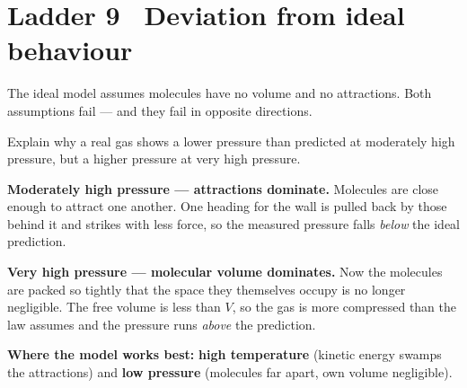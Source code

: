 \documentclass{apchem-worksheet}
\begin{document}
\section*{\sffamily Ladder 9 \textbullet\ Deviation from ideal behaviour}

The ideal model assumes molecules have no volume and no attractions. Both
assumptions fail --- and they fail in opposite directions.

\begin{workedexample}
Explain why a real gas shows a lower pressure than predicted at moderately
high pressure, but a higher pressure at very high pressure.

\textbf{Moderately high pressure --- attractions dominate.} Molecules are
close enough to attract one another. One heading for the wall is pulled
back by those behind it and strikes with less force, so the measured
pressure falls \emph{below} the ideal prediction.

\textbf{Very high pressure --- molecular volume dominates.} Now the
molecules are packed so tightly that the space they themselves occupy is
no longer negligible. The free volume is less than $V$, so the gas is more
compressed than the law assumes and the pressure runs \emph{above} the
prediction.

\textbf{Where the model works best:} \textbf{high temperature} (kinetic
energy swamps the attractions) and \textbf{low pressure} (molecules far
apart, own volume negligible).
\end{workedexample}
\end{document}
